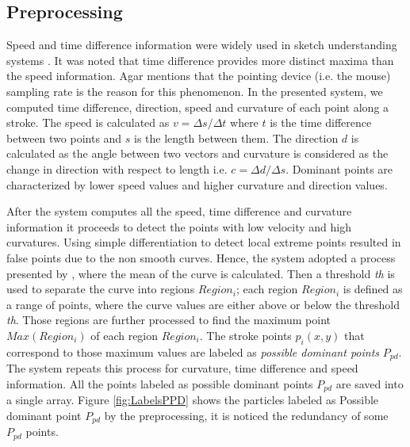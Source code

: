 \documentclass[12pt,1p,times]{elsarticle}%
\begin{document}
\subsection{Preprocessing}
\label{Prepross}
 Speed and time difference information were widely used in sketch understanding systems \cite{earlyprocess}. It was noted that time difference provides more distinct maxima than the speed information. Agar \cite{polygonfeedback31} mentions that the pointing device (i.e. the mouse) sampling rate is the reason for this phenomenon. 
 In the presented system, we computed time difference, direction, speed and curvature of each point along a stroke. The speed is calculated as $v=\Delta s/\Delta t$ where $t$ is the time difference between two points and $s$ is the length between them. The direction $d$ is calculated as the angle between two vectors and curvature is considered as the change in direction with respect to length i.e. $c= \Delta d/\Delta s$. Dominant points are characterized by lower speed values and higher curvature and direction values.
  
After the system computes all the speed, time difference and curvature information it proceeds to detect the points with low velocity and high curvatures. Using simple differentiation to detect local extreme points resulted in false points due to the non smooth curves. Hence, the system adopted a process presented by \cite{earlyprocess}, where the mean of the curve is calculated. Then a threshold \textit{th} is used to separate the curve into regions $Region_i$; each region $Region_i$ is defined as a range of points, where the curve values are either above or below the threshold \textit{th}. Those regions are further processed to find the maximum point $Max(Region_i)$ of each region $Region_i$. The stroke points $p_i(x,y)$ that correspond to those maximum values are labeled as \textit{possible dominant points} $P_{pd}$. The system repeats this process for curvature, time difference and speed information. All the points labeled as possible dominant points $P_{pd}$ are saved into a single array. Figure \ref{fig:LabelsPPD} shows the particles labeled as Possible dominant point $P_{pd}$ by the preprocessing, it is noticed the redundancy of some $P_{pd}$ points. %
\end{document}
